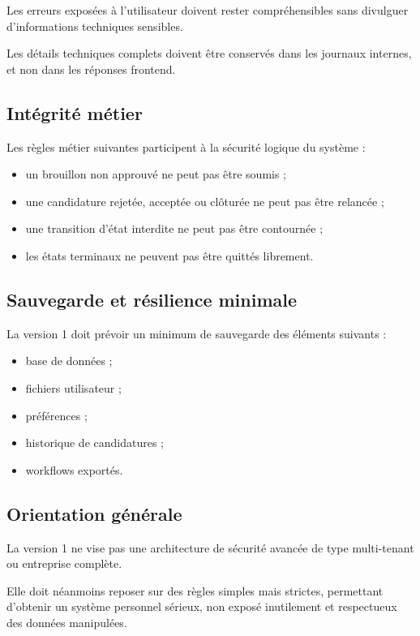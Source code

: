 \documentclass[11pt,a4paper]{article}
\begin{document}
Les erreurs exposées à l’utilisateur doivent rester compréhensibles sans divulguer d’informations techniques sensibles.

Les détails techniques complets doivent être conservés dans les journaux internes, et non dans les réponses frontend.

\subsection{Intégrité métier}

Les règles métier suivantes participent à la sécurité logique du système :

\begin{itemize}
    \item un brouillon non approuvé ne peut pas être soumis ;
    \item une candidature rejetée, acceptée ou clôturée ne peut pas être relancée ;
    \item une transition d’état interdite ne peut pas être contournée ;
    \item les états terminaux ne peuvent pas être quittés librement.
\end{itemize}

\subsection{Sauvegarde et résilience minimale}

La version 1 doit prévoir un minimum de sauvegarde des éléments suivants :

\begin{itemize}
    \item base de données ;
    \item fichiers utilisateur ;
    \item préférences ;
    \item historique de candidatures ;
    \item workflows exportés.
\end{itemize}

\subsection{Orientation générale}

La version 1 ne vise pas une architecture de sécurité avancée de type multi-tenant ou entreprise complète.

Elle doit néanmoins reposer sur des règles simples mais strictes, permettant d’obtenir un système personnel sérieux, non exposé inutilement et respectueux des données manipulées.
\end{document}
